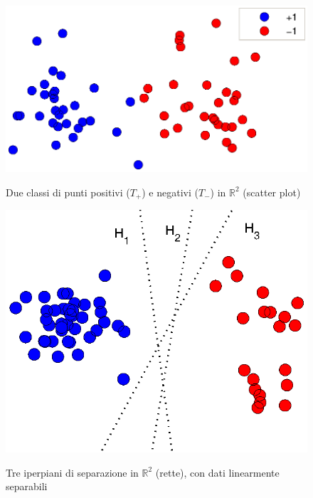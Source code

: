 \begin{figure} %
 	\centering	
	
	\fboxsep=0mm%
	\fboxrule=1mm%

	 {
		\includegraphics[scale=1]{img/FiguraA_ScatterPN.eps}
	}	
	\caption{Due classi di punti positivi ($T_+$) e negativi ($T_-$) in $\mathbb{R}^2$ (scatter plot)}
\end{figure}

\begin{figure} %
 	\centering	
	
	\fboxsep=0mm%
	\fboxrule=1mm%

	 {
		\includegraphics[scale=1]{img/FiguraB_PNconIperpiano.eps}
	}	
	\caption{Tre iperpiani di separazione in $\mathbb{R}^2$ (rette), con dati linearmente separabili}
\end{figure}

